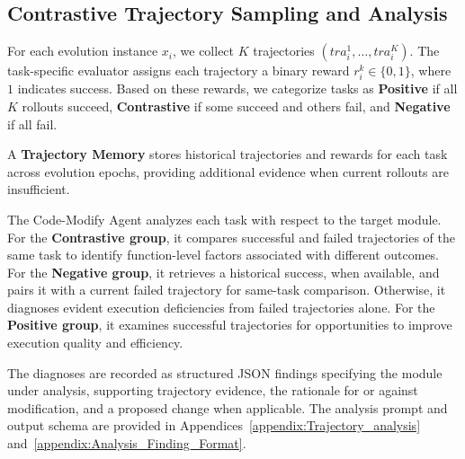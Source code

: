 \documentclass{article} %
\begin{document}
\subsection{Contrastive Trajectory Sampling and Analysis}
\label{Sec:Contrastive_Trajectory_Analysis}




For each evolution instance $x_i$, we collect $K$ trajectories $(tra_i^1,\ldots,tra_i^K)$.
The task-specific evaluator assigns each trajectory a binary reward $r_i^k \in \{0,1\}$, where $1$ indicates success.
Based on these rewards, we categorize tasks as \textbf{Positive} if all $K$ rollouts succeed, \textbf{Contrastive} if some succeed and others fail, and \textbf{Negative} if all fail.


A \textbf{Trajectory Memory} stores historical trajectories and rewards for each task across evolution epochs, providing additional evidence when current rollouts are insufficient.

The Code-Modify Agent analyzes each task with respect to the target module.
For the \textbf{Contrastive group}, it compares successful and failed trajectories of the same task to identify function-level factors associated with different outcomes.
For the \textbf{Negative group}, it retrieves a historical success, when available, and pairs it with a current failed trajectory for same-task comparison.
Otherwise, it diagnoses evident execution deficiencies from failed trajectories alone.
For the \textbf{Positive group}, it examines successful trajectories for opportunities to improve execution quality and efficiency.

The diagnoses are recorded as structured JSON findings specifying the module under analysis, supporting trajectory evidence, the rationale for or against modification, and a proposed change when applicable.
The analysis prompt and output schema are provided in Appendices~\ref{appendix:Trajectory_analysis} and~\ref{appendix:Analysis_Finding_Format}.
\end{document}
